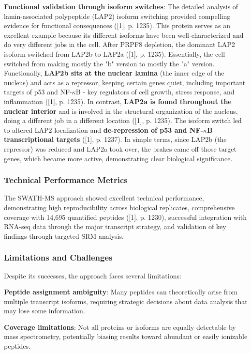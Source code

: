 \documentclass[12pt,a4paper]{article}
\begin{document}
\textbf{Functional validation through isoform switches}: The detailed analysis of lamin-associated polypeptide (LAP2) isoform switching provided compelling evidence for functional consequences ([1], p. 1235). This protein serves as an excellent example because its different isoforms have been well-characterized and do very different jobs in the cell. After PRPF8 depletion, the dominant LAP2 isoform switched from LAP2b to LAP2a ([1], p. 1235). Essentially, the cell switched from making mostly the "b" version to mostly the "a" version. Functionally, \textbf{LAP2b sits at the nuclear lamina} (the inner edge of the nucleus) and acts as a repressor, keeping certain genes quiet, including important targets of p53 and NF-$\kappa$B - key regulators of cell growth, stress response, and inflammation ([1], p. 1235). In contrast, \textbf{LAP2a is found throughout the nuclear interior} and is involved in the structural organization of the nucleus, doing a different job in a different location ([1], p. 1235). The isoform switch led to altered LAP2 localization and \textbf{de-repression of p53 and NF-$\kappa$B transcriptional targets} ([1], p. 1237). In simple terms, since LAP2b (the repressor) was reduced and LAP2a took over, the brakes came off those target genes, which became more active, demonstrating clear biological significance.

\subsubsection{Technical Performance Metrics}

The SWATH-MS approach showed excellent technical performance, demonstrating high reproducibility across biological replicates, comprehensive coverage with 14,695 quantified peptides ([1], p. 1230), successful integration with RNA-seq data through the major transcript strategy, and validation of key findings through targeted SRM analysis.

\subsubsection{Limitations and Challenges}

Despite its successes, the approach faces several limitations:

\textbf{Peptide assignment ambiguity}: Many peptides can theoretically arise from multiple transcript isoforms, requiring strategic decisions about data analysis that may lose some information.

\textbf{Coverage limitations}: Not all proteins or isoforms are equally detectable by mass spectrometry, potentially biasing results toward abundant or easily ionizable peptides.
\end{document}
